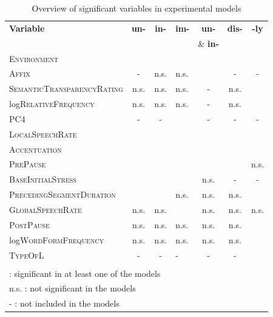 \begin{table}[t!]
	\caption{Overview of significant variables in experimental models}
	\label{tbl: Overview of complete results in the experimental study}
	\centering
	\begin{center}
		\begin{tabular} {lcclccc}
			
			
			\textbf{Variable} & \textbf{un-} & \textbf{in-} & \textbf{im-}&\textbf{un-} &\textbf{dis-}& \textbf{-ly}\\
			& & & &\& \textbf{in-}  && \\
			\hline			
			\textsc{Environment}& \checkmark & \checkmark  & \checkmark  &\checkmark   &  \checkmark & \checkmark \\ 
			\textsc{Affix }&- &n.s. & n.s. & \checkmark  &- & -\\ 
			\textsc{SemanticTransparencyRating}&n.s.& n.s.&n.s.  & - &n.s. &\checkmark  \\
			log\textsc{RelativeFrequency}&n.s.& n.s.&n.s.  & - &n.s. &\checkmark  \\
					\textsc{PC4}&-& -&\checkmark & - &- &-  \\	
			\textsc{LocalSpeechRate}&\checkmark & \checkmark & \checkmark & \checkmark  &\checkmark  & \checkmark \\	
			\textsc{Accentuation}&\checkmark &  \checkmark & \checkmark &\checkmark  & \checkmark & \checkmark \\		
			\textsc{PrePause}&\checkmark &\checkmark& \checkmark&\checkmark  & \checkmark & n.s.\\
			\textsc{BaseInitialStress}&\checkmark& \checkmark &\checkmark  & n.s. &- &-\\
			
			\textsc{PrecedingSegmentDuration}&\checkmark &\checkmark & n.s. & n.s.&n.s.  & \checkmark \\

			\textsc{GlobalSpeechRate}&n.s.& n.s. &\checkmark  &n.s. &  n.s. & n.s.\\	

			\textsc{PostPause}&n.s. & n.s.& n.s. &n.s.  & n.s. &\checkmark \\		
			log\textsc{WordFormFrequency}&n.s. & n.s.& n.s. &n.s.  & n.s. &\checkmark \\		
						\textsc{TypeOfL}&- & -& -&- & -&\checkmark \\
			\hline\\
			
			\multicolumn{6}{l}{\small \checkmark \hspace*{0.2cm}: significant in at least one of the models} \\			
			\multicolumn{6}{l}{\small n.s. : not significant in the models} \\			
			\multicolumn{6}{l}{\small - \hspace*{0.45cm}: not included in the models} \\			
			
		\end{tabular}
	\end{center}
	
	
	
\end{table}




